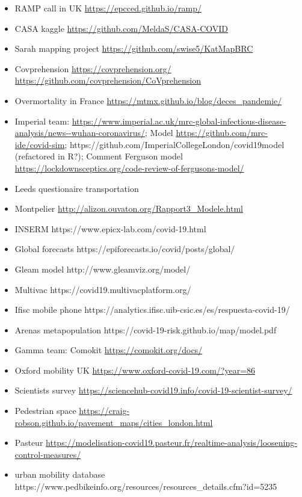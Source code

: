 \documentclass[10pt]{article}
\begin{document}
\begin{itemize}
	\item RAMP call in UK \url{https://epcced.github.io/ramp/}
	\item CASA kaggle \url{https://github.com/MeldaS/CASA-COVID}
	\item Sarah mapping project \url{https://github.com/swise5/KatMapBRC}
	\item Covprehension \url{https://covprehension.org/} \url{https://github.com/covprehension/CoVprehension}
	\item Overmortality in France \url{https://mtmx.github.io/blog/deces_pandemie/}
	\item Imperial team: \url{https://www.imperial.ac.uk/mrc-global-infectious-disease-analysis/news--wuhan-coronavirus/}; Model \url{https://github.com/mrc-ide/covid-sim}; https://github.com/ImperialCollegeLondon/covid19model (refactored in R?); Comment Ferguson model \url{https://lockdownsceptics.org/code-review-of-fergusons-model/}
	\item Leeds questionaire transportation %
	\item Montpelier \url{http://alizon.ouvaton.org/Rapport3_Modele.html}
	\item INSERM https://www.epicx-lab.com/covid-19.html
	\item Global forecasts https://epiforecasts.io/covid/posts/global/
	\item Gleam model http://www.gleamviz.org/model/
	\item Multivac https://covid19.multivacplatform.org/
	\item Ifisc mobile phone https://analytics.ifisc.uib-csic.es/es/respuesta-covid-19/
	\item Arenas metapopulation https://covid-19-risk.github.io/map/model.pdf
	\item Gamma team: Comokit \url{https://comokit.org/docs/}
	\item Oxford mobility UK \url{https://www.oxford-covid-19.com/?year=86}
	\item Scientists survey \url{https://sciencehub-covid19.info/covid-19-scientist-survey/}
	\item Pedestrian space \url{https://craig-robson.github.io/pavement_maps/cities_london.html}
	\item Pasteur \url{https://modelisation-covid19.pasteur.fr/realtime-analysis/loosening-control-measures/}
	\item urban mobility database https://www.pedbikeinfo.org/resources/resources_details.cfm?id=5235
\end{itemize}
\end{document}

